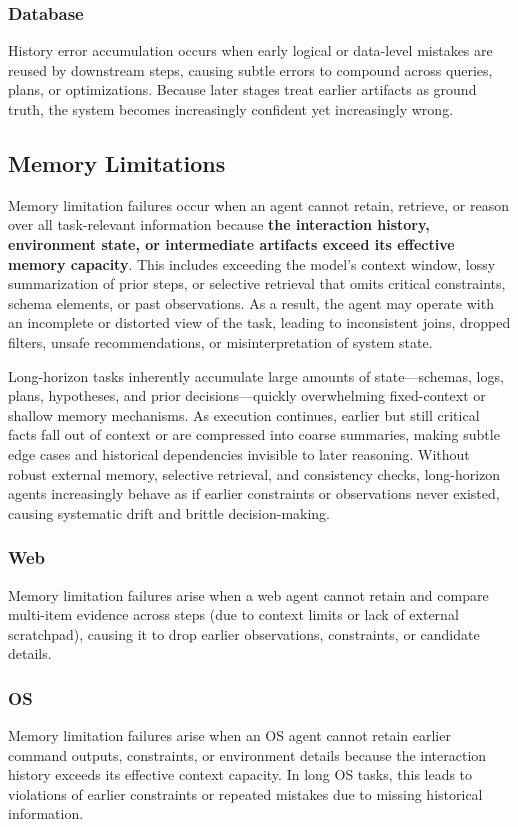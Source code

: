\documentclass[11pt]{article}
\begin{document}
\subsubsection{Database}
History error accumulation occurs when early logical or data-level mistakes are reused by downstream steps, causing subtle errors to compound across queries, plans, or optimizations. Because later stages treat earlier artifacts as ground truth, the system becomes increasingly confident yet increasingly wrong.


\subsection{Memory Limitations}
Memory limitation failures occur when an agent cannot retain, retrieve, or reason over all task-relevant information because \textbf{the interaction history, environment state, or intermediate artifacts exceed its effective memory capacity}. This includes exceeding the model’s context window, lossy summarization of prior steps, or selective retrieval that omits critical constraints, schema elements, or past observations. As a result, the agent may operate with an incomplete or distorted view of the task, leading to inconsistent joins, dropped filters, unsafe recommendations, or misinterpretation of system state.

Long-horizon tasks inherently accumulate large amounts of state—schemas, logs, plans, hypotheses, and prior decisions—quickly overwhelming fixed-context or shallow memory mechanisms. As execution continues, earlier but still critical facts fall out of context or are compressed into coarse summaries, making subtle edge cases and historical dependencies invisible to later reasoning. Without robust external memory, selective retrieval, and consistency checks, long-horizon agents increasingly behave as if earlier constraints or observations never existed, causing systematic drift and brittle decision-making.
\subsubsection{Web}
Memory limitation failures arise when a web agent cannot retain and compare multi-item evidence across steps (due to context limits or lack of external scratchpad), causing it to drop earlier observations, constraints, or candidate details.
\subsubsection{OS}
Memory limitation failures arise when an OS agent cannot retain earlier command outputs, constraints, or environment details because the interaction history exceeds its effective context capacity. In long OS tasks, this leads to violations of earlier constraints or repeated mistakes due to missing historical information.
\end{document}
